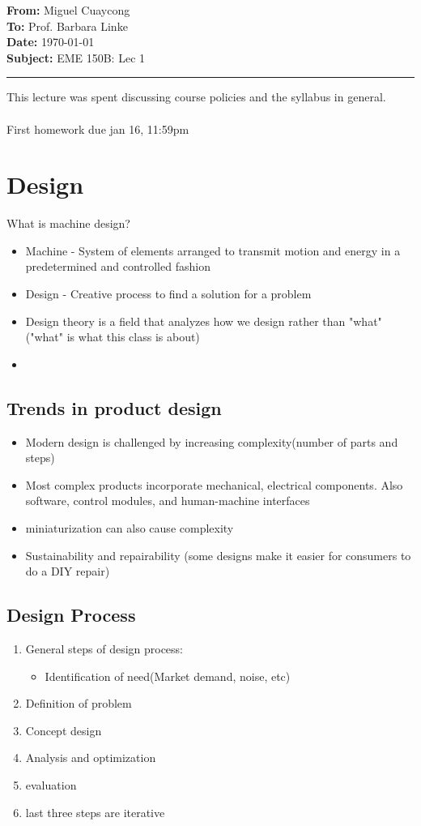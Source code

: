 \documentclass[11pt]{article}
\newcommand{\memoheader}[4]{
  \noindent
  \textbf{From:} #2\\ 
  \textbf{To:} #1\\
  \textbf{Date:} #3\\
  \textbf{Subject:} #4\\[1ex]\hrule\vspace{1.5ex}
}
\begin{document}
\memoheader{Prof. Barbara Linke}
            {Miguel Cuaycong}
            {\today}
            {EME 150B: Lec 1}
\noindent This lecture was spent discussing course policies and the syllabus in general.
\\~\\
First homework due jan 16, 11:59pm
\section*{Design}
What is machine design?
\begin{itemize}
    \item Machine - System of elements arranged to transmit motion and energy in a predetermined and controlled fashion
    \item Design - Creative process to find a solution for a problem
    \item Design theory is a field that analyzes how we design rather than "what"("what" is what this class is about)
    \item 
\end{itemize}
\subsection*{Trends in product design}
\begin{itemize}
    \item Modern design is challenged by increasing complexity(number of parts and steps)
    \item Most complex products incorporate mechanical, electrical components. Also software, control modules, and human-machine interfaces
    \item miniaturization can also cause complexity
    \item Sustainability and repairability (some designs make it easier for consumers to do a DIY repair)
\end{itemize}
\subsection*{Design Process}
\begin{enumerate}
    \item General steps of design process:
    \begin{itemize}
        \item Identification of need(Market demand, noise, etc)
    \end{itemize}
    \item Definition of problem
    \item Concept design
    \item Analysis and optimization
    \item evaluation
    \item last three steps are iterative
\end{enumerate}
\end{document}
